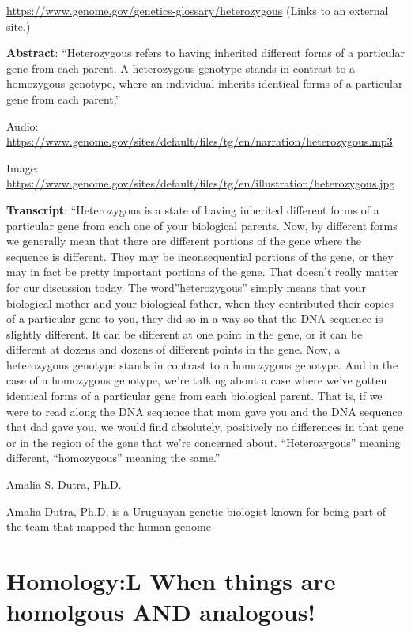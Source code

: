 \documentclass[
]{book}
\begin{document}
\url{https://www.genome.gov/genetics-glossary/heterozygous} (Links to an external site.)

\textbf{Abstract}: ``Heterozygous refers to having inherited different forms of a particular gene from each parent. A heterozygous genotype stands in contrast to a homozygous genotype, where an individual inherits identical forms of a particular gene from each parent.''

Audio: \url{https://www.genome.gov/sites/default/files/tg/en/narration/heterozygous.mp3}

Image: \url{https://www.genome.gov/sites/default/files/tg/en/illustration/heterozygous.jpg}

\textbf{Transcript}: ``Heterozygous is a state of having inherited different forms of a particular gene from each one of your biological parents. Now, by different forms we generally mean that there are different portions of the gene where the sequence is different. They may be inconsequential portions of the gene, or they may in fact be pretty important portions of the gene. That doesn't really matter for our discussion today. The word''heterozygous'' simply means that your biological mother and your biological father, when they contributed their copies of a particular gene to you, they did so in a way so that the DNA sequence is slightly different. It can be different at one point in the gene, or it can be different at dozens and dozens of different points in the gene. Now, a heterozygous genotype stands in contrast to a homozygous genotype. And in the case of a homozygous genotype, we're talking about a case where we've gotten identical forms of a particular gene from each biological parent. That is, if we were to read along the DNA sequence that mom gave you and the DNA sequence that dad gave you, we would find absolutely, positively no differences in that gene or in the region of the gene that we're concerned about. ``Heterozygous'' meaning different, ``homozygous'' meaning the same.''

Amalia S. Dutra, Ph.D.

Amalia Dutra, Ph.D, is a Uruguayan genetic biologist known for being part of the team that mapped the human genome

\hypertarget{homologyl-when-things-are-homolgous-and-analogous}{%
\section{Homology:L When things are homolgous AND analogous!}\label{homologyl-when-things-are-homolgous-and-analogous}}
\end{document}

